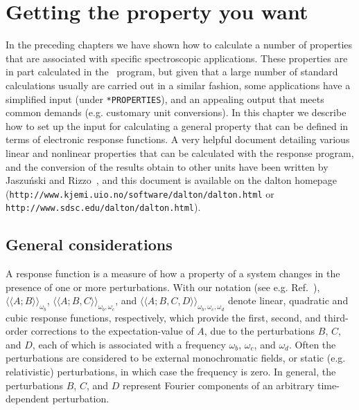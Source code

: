 \chapter{Getting the property you want}\label{ch:rspchap}


In the preceding chapters we have shown how to calculate a number of
properties that are associated with specific spectroscopic applications.
These properties are in part
calculated in the \resp\ program, but given that a large number of
standard calculations usually are carried out in a similar fashion, some
applications have a simplified input (under {\tt **PROPERTIES}), 
and an appealing output that meets common demands 
(e.g. customary unit conversions). In this chapter we
describe how to set up the input for calculating a general property that
can be defined in terms of electronic response functions. A very
helpful document detailing various linear and nonlinear properties
that can be calculated with the response program, and the conversion
of the results obtain to other units have been written by
Jaszu\'{n}ski and Rizzo~\cite{}, and this document is available on the
dalton homepage
(\verb|http://www.kjemi.uio.no/software/dalton/dalton.html| or \verb|http://www.sdsc.edu/dalton/dalton.html|).

\section{General considerations}
\label{sec:rspgen}

\begin{center}
\end{center}

A response function is a measure of how a property of a system changes in
the presence of one or more perturbations. With our notation (see e.g.
Ref.~\cite{jopjjcp82}),  $\langle\!\langle A;B\rangle\!\rangle_{\omega_b}$,
$\langle\!\langle A;B,C\rangle\!\rangle_{\omega_b,\omega_c}$, and 
$\langle\!\langle A;B,C,D\rangle\!\rangle_{\omega_b,\omega_c,\omega_d}$
denote linear, quadratic and cubic response
functions, respectively, which
provide the first, second, and third-order corrections to the
expectation-value of $A$, due to the perturbations $B$, $C$, and $D$, each of
which is associated with a frequency $\omega_b$, $\omega_c$, and
$\omega_d$. Often the perturbations are considered to be 
external monochromatic fields, or static (e.g. relativistic) perturbations,
in which case the frequency is zero.   In general, the perturbations $B$,
$C$, and $D$ represent Fourier components of an arbitrary time-dependent
perturbation.

